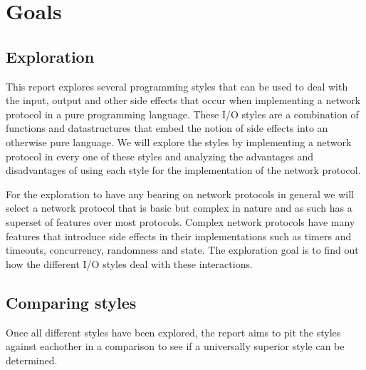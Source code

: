 \chapter{Goals}
\section{Exploration}
This report explores several programming styles that can be used to deal with the input, output and other side effects that occur when implementing a network protocol in a pure programming language.
These I/O styles are a combination of functions and datastructures that embed the notion of side effects into an otherwise pure language.
We will explore the styles by implementing a network protocol in every one of these styles and analyzing the advantages and disadvantages of using each style for the implementation of the network protocol.

For the exploration to have any bearing on network protocols in general we will select a network protocol that is basic but complex in nature and as such has a superset of features over most protocols. 
Complex network protocols have many features that introduce side effects in their implementations such as timers and timeouts, concurrency, randomness and state.
The exploration goal is to find out how the different I/O styles deal with these interactions.

\section{Comparing styles}
Once all different styles have been explored, the report aims to pit the styles against eachother in a comparison to see if a universally superior style can be determined.
